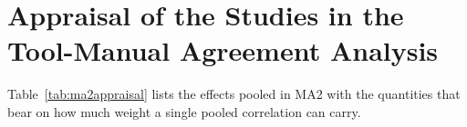\appendixstart
\appendix
\section{Appraisal of the Studies in the Tool-Manual Agreement Analysis}
\label{app:appraisal}

Table~\ref{tab:ma2appraisal} lists the effects pooled in MA2 with the quantities that bear on how much weight a single pooled correlation can carry.


